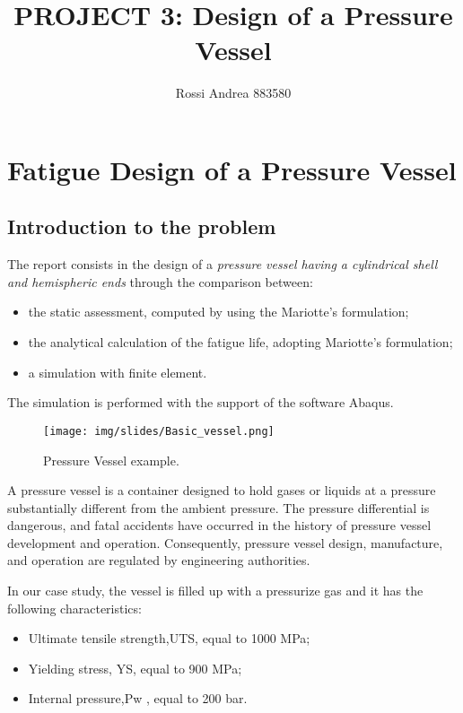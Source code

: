 \documentclass[a4paper,12pt]{article}
\title{PROJECT 3: Design of a Pressure Vessel}
\author{Rossi Andrea 883580}
\date{}
\begin{document}
\maketitle

\section{Fatigue Design of a Pressure Vessel}

\subsection{Introduction to the problem}


The report consists in the design of a \emph{pressure vessel having a cylindrical shell and hemispheric ends} through the comparison between:
\begin{itemize}
\item the static assessment, computed by using the Mariotte's formulation;
\item the analytical calculation of the fatigue life, adopting Mariotte's formulation;
\item a simulation with finite element.
\end{itemize} 

The simulation is performed with the support of the software Abaqus.

\begin{figure}[H]
\centering
\texttt{[image: img/slides/Basic\_vessel.png]}
\caption{Pressure Vessel example.}
\label{fig:Vessel_example}
\end{figure}

A pressure vessel is a container designed to hold gases or liquids at a pressure substantially different from the ambient pressure.
The pressure differential is dangerous, and fatal accidents have occurred in the history of pressure vessel development and operation. Consequently, pressure vessel design, manufacture, and operation are regulated by engineering authorities.

In our case study, the vessel is filled up with a pressurize gas and it has the following characteristics:
\begin{itemize}
\item Ultimate tensile strength,UTS, equal to 1000 MPa;
\item Yielding stress, YS, equal to 900 MPa;
\item Internal pressure,Pw , equal to 200 bar.
\end{itemize}
\end{document}
